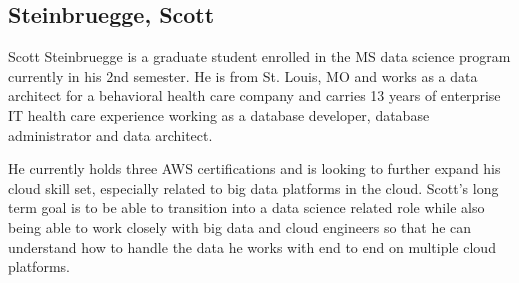 \subsection{Steinbruegge, Scott}

Scott Steinbruegge is a graduate student enrolled in the MS data science program currently in his 2nd semester. 
He is from St. Louis, MO and works as a data architect for a behavioral health care company and carries 13 years 
of enterprise IT health care experience working as a database developer, database administrator and data architect.

He currently holds three AWS certifications and is looking to further expand his cloud skill set, especially related 
to big data platforms in the cloud. Scott's long term goal is to be able to transition into a data science related 
role while also being able to work closely with big data and cloud engineers so that he can understand how to 
handle the data he works with end to end on multiple cloud platforms.
